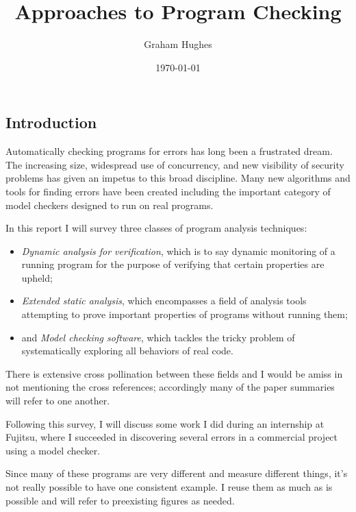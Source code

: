 \documentclass{article}
\begin{document}
\title{Approaches to Program Checking}
\author{Graham Hughes}
\date\today
\maketitle

\begin{multicols}{2}


\section{Introduction}

Automatically checking programs for errors has long been a frustrated
dream.  The increasing size, widespread use of concurrency, and new
visibility of security problems has given an impetus to this broad
discipline.  Many new algorithms and tools for finding errors have
been created including the important category of model checkers
designed to run on real programs.

In this report I will survey three classes of program analysis
techniques:
\begin{itemize}
\item \textit{Dynamic analysis for verification}, which is to say
  dynamic monitoring of a running program for the purpose of verifying
  that certain properties are upheld;
\item \textit{Extended static analysis}, which encompasses a field of
  analysis tools attempting to prove important properties of programs
  without running them;
\item and \textit{Model checking software}, which tackles the tricky
  problem of systematically exploring all behaviors of real code.
\end{itemize}
There is extensive cross pollination between these fields and I would
be amiss in not mentioning the cross references; accordingly many of
the paper summaries will refer to one another.

Following this survey, I will discuss some work I did during an
internship at Fujitsu, where I succeeded in discovering several errors
in a commercial project using a model checker.

Since many of these programs are very different and measure different
things, it's not really possible to have one consistent example.  I
reuse them as much as is possible and will refer to preexisting
figures as needed.


\end{multicols}
\end{document}
